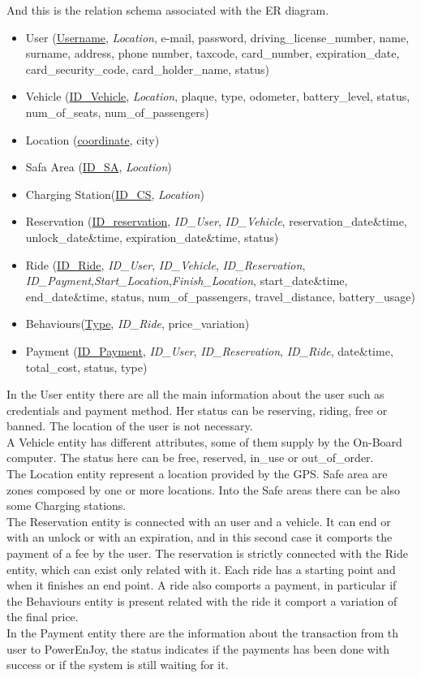  And this is the relation schema associated with the ER diagram.
\begin{itemize} 
	\item{User (\underline{Username}, \textit{Location}, e-mail, password, driving\_license\_number, name, surname, address, phone number, taxcode, card\_number, expiration\_date, card\_security\_code, card\_holder\_name, status)} %
	\item{Vehicle (\underline{ID\_Vehicle}, \textit{Location}, plaque, type, odometer, battery\_level, status, num\_of\_seats, num\_of\_passengers) }
	\item{Location (\underline{coordinate}, city)}	
	\item{Safa Area (\underline{ID\_SA}, \textit{Location})} %
	\item{Charging Station(\underline{ID\_CS}, \textit{Location})}
	\item{Reservation (\underline{ID\_reservation}, \textit{ID\_User}, \textit{ID\_Vehicle}, reservation\_date\&time, unlock\_date\&time, expiration\_date\&time, status)}
	\item{Ride (\underline{ID\_Ride}, \textit{ID\_User}, \textit{ID\_Vehicle}, \textit{ID\_Reservation}, \textit{ID\_Payment},\textit{Start\_Location},\textit{Finish\_Location}, start\_date\&time, end\_date\&time, status, num\_of\_passengers, travel\_distance, battery\_usage)}
	\item{Behaviours(\underline{Type}, \textit{ID\_Ride}, price\_variation)}
	\item{Payment (\underline{ID\_Payment}, \textit{ID\_User}, \textit{ID\_Reservation}, \textit{ID\_Ride}, date\&time, total\_cost, status, type)}
\end{itemize}
In the User entity there are all the main information about the user such as credentials and payment method. Her status can be reserving, riding, free or banned. The location of the user is not necessary.
\\A Vehicle entity has different attributes, some of them supply by the On-Board computer. The status here can be free, reserved, in\_use or out\_of\_order.
\\The Location entity represent a location provided by the GPS. Safe area are zones composed by one or more locations. Into the Safe areas there can be also some Charging stations.
\\The Reservation entity is connected with an user and a vehicle. It can end or with an unlock or with an expiration, and in this second case it comports the payment of a fee by the user. The reservation is strictly connected with the Ride entity, which can exist only related with it. Each ride has a starting point and when it finishes an end point. A ride also comports a payment, in particular if the Behaviours entity is present related with the ride it comport a variation of the final price. 
\\In the Payment entity there are the information about the transaction from th user to PowerEnJoy, the status indicates if the payments has been done with success or if the system is still waiting for it.

